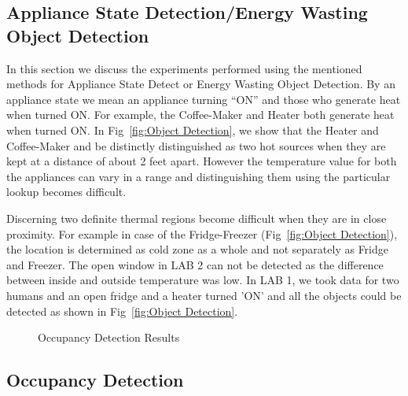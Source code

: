     \subsection{Appliance State Detection/Energy Wasting Object Detection} 
    
    In this section we discuss the experiments performed using the mentioned methods for Appliance State Detect or Energy Wasting Object Detection. By an appliance state we mean an appliance turning ``ON'' and those who generate heat when turned ON. For example, the  Coffee-Maker and Heater both generate heat when turned ON. In Fig~\ref{fig:Object Detection}, we show that the Heater and Coffee-Maker and be distinctly distinguished as two hot sources when they are kept at a distance of about 2 feet apart. However the temperature value for both the appliances can vary in a range and distinguishing them using the particular lookup becomes difficult. 
    
   Discerning two definite thermal regions become difficult when they are in close proximity. For example in case of the Fridge-Freezer (Fig~\ref{fig:Object Detection}), the location is determined as cold zone as a whole and not separately as Fridge and Freezer. The open window in LAB 2 can not be detected as the difference between inside and outside temperature was low. In LAB 1, we took data for two humans and an open fridge and a heater turned 'ON' and all the objects could be detected as shown in Fig~\ref{fig:Object Detection}.
   

    
    
    
    
    \begin{figure}[t!]
    	\begin{center}
    	\end{center}
    	\caption{Occupancy Detection Results}
    	\label{fig:Occupancy}
    \end{figure}
    
    
     \subsection{Occupancy Detection} 
     
     
     
